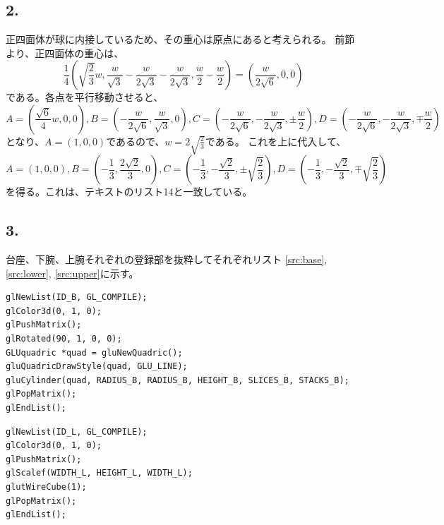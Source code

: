 \documentclass{jsarticle}
\begin{document}
    \subsection*{2.}
        正四面体が球に内接しているため、その重心は原点にあると考えられる。
        前節より、正四面体の重心は、
        \begin{equation*}
            \frac{1}{4}\left(\sqrt{\frac{2}{3}}w,\frac{w}{\sqrt{3}}-\frac{w}{2\sqrt{3}}-\frac{w}{2\sqrt{3}},\frac{w}{2}-\frac{w}{2}\right)=\left(\frac{w}{2\sqrt{6}},0,0\right)
        \end{equation*}
        である。各点を平行移動させると、
        \begin{equation*}
            A=\left(\frac{\sqrt{6}}{4}w,0,0\right),
            B=\left(-\frac{w}{2\sqrt{6}},\frac{w}{\sqrt{3}},0\right),
            C=\left(-\frac{w}{2\sqrt{6}},-\frac{w}{2\sqrt{3}},\pm\frac{w}{2}\right),
            D=\left(-\frac{w}{2\sqrt{6}},-\frac{w}{2\sqrt{3}},\mp\frac{w}{2}\right)
        \end{equation*}
        となり、$A=(1,0,0)$であるので、$\displaystyle w=2\sqrt{\frac{2}{3}}$である。
        これを上に代入して、
        \begin{equation*}
            A=\left(1,0,0\right),
            B=\left(-\frac{1}{3},\frac{2\sqrt{2}}{3},0\right),
            C=\left(-\frac{1}{3},-\frac{\sqrt{2}}{3},\pm\sqrt{\frac{2}{3}}\right),
            D=\left(-\frac{1}{3},-\frac{\sqrt{2}}{3},\mp\sqrt{\frac{2}{3}}\right)
        \end{equation*}
        を得る。これは、テキストのリスト14と一致している。

    \subsection*{3.}
        台座、下腕、上腕それぞれの登録部を抜粋してそれぞれリスト
        \ref{src:base}, \ref{src:lower}, \ref{src:upper}に示す。

        \begin{lstlisting}[caption=台座の登録部, label=src:base]
glNewList(ID_B, GL_COMPILE);
glColor3d(0, 1, 0);
glPushMatrix();
glRotated(90, 1, 0, 0);
GLUquadric *quad = gluNewQuadric();
gluQuadricDrawStyle(quad, GLU_LINE);
gluCylinder(quad, RADIUS_B, RADIUS_B, HEIGHT_B, SLICES_B, STACKS_B);
glPopMatrix();
glEndList();\end{lstlisting}

        \begin{lstlisting}[caption=下腕の登録部, label=src:lower]
glNewList(ID_L, GL_COMPILE);
glColor3d(0, 1, 0);
glPushMatrix();
glScalef(WIDTH_L, HEIGHT_L, WIDTH_L);
glutWireCube(1);
glPopMatrix();
glEndList();\end{lstlisting}
\end{document}
